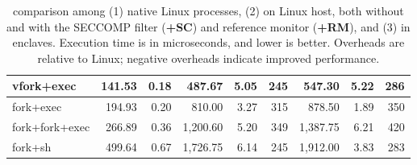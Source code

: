 \begin{table}[t!b!]
\begin{tabular}{|l|rr|rrr|rrr|}
vfork+exec     & 141.53 & 0.18 &   487.67 & 5.05 & 245 &   547.30 & 5.22 &   286   \\\hline
fork+exec      & 194.93 & 0.20 &   810.00 & 3.27 & 315 &   878.50 & 1.89 &   350   \\\hline
fork+fork+exec & 266.89 & 0.36 & 1,200.60 & 5.20 & 349 & 1,387.75 & 6.21 &   420   \\\hline
fork+sh        & 499.64 & 0.67 & 1,726.75 & 6.14 & 245 & 1,912.00 & 3.83 &   283   \\\hline
\end{tabular}
\caption[\lmbench{} benchmarking results in Linux, KVM and \graphene{}]
{\lmbench{} comparison among (1) native Linux processes, (2) \graphene{} \picoprocs{} on Linux host, both without and with the SECCOMP filter ({\bf +SC}) and reference monitor ({\bf +RM}), and (3) \graphene{} in \sgx{} enclaves.
Execution time is in microseconds, and lower is better. 
Overheads are relative to Linux; negative overheads indicate improved performance.} 
\label{tab:graphene:lmbench}
\end{table}


